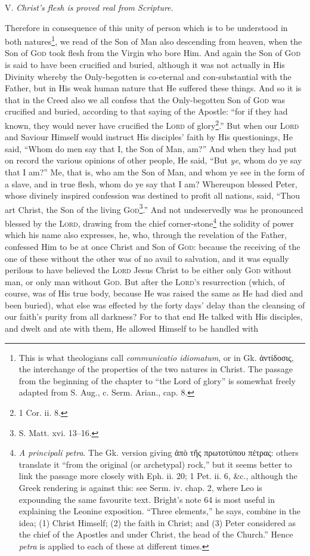 V. \emph{Christ’s flesh is proved real from Scripture.}

Therefore in consequence of this unity of person which is to be understood in both natures\footnote{This is what theologians call \emph{communicatio idiomatum}, or in Gk. \textgreek{ἀντίδοσις}, the interchange of the properties of the two natures in Christ. The passage from the beginning of the chapter to “the Lord of glory” is somewhat freely adapted from S. Aug., c. Serm. Arian., cap. 8.}, we read of the Son of Man also descending from heaven, when the Son of \textsc{God} took flesh from the Virgin who bore Him. And again the Son of \textsc{God} is said to have been crucified and buried, although it was not actually in His Divinity whereby the Only-begotten is co-eternal and con-substantial with the Father, but in His weak human nature that He suffered these things. And so it is that in the Creed also we all confess that the Only-begotten Son of \textsc{God} was crucified and buried, according to that saying of the Apostle: “for if they had known, they would never have crucified the \textsc{Lord} of glory\footnote{1 Cor. ii. 8.}.” But when our \textsc{Lord} and Saviour Himself would instruct His disciples’ faith by His questionings, He said, “Whom do men say that I, the Son of Man, am?” And when they had put on record the various opinions of other people, He said, “But \emph{ye}, whom do ye say that I am?” Me, that is, who am the Son of Man, and whom ye see in the form of a slave, and in true flesh, whom do ye say that I am? Whereupon blessed Peter, whose divinely inspired confession was destined to profit all nations, said, “Thou art Christ, the Son of the living \textsc{God\footnote{S. Matt. xvi. 13–16.}}.” And not undeservedly was he pronounced blessed by the \textsc{Lord}, drawing from the chief corner-stone\footnote{\emph{A principali petra}. The Gk. version giving \textgreek{ἀπὸ τῆς πρωτοτύπου πέτρας}: others translate it “from the original (or archetypal) rock,” but it seems better to link the passage more closely with Eph. ii. 20; 1 Pet. ii. 6, \&c., although the Greek rendering is against this: see Serm. iv. chap. 2, where Leo is expounding the same favourite text. Bright’s note 64 is most useful in explaining the Leonine exposition. “Three elements,” he says, combine in the idea; (1) Christ Himself; (2) the faith in Christ; and (3) Peter considered as the chief of the Apostles and under Christ, the head of the Church.” Hence \emph{petra} is applied to each of these at different times.} the solidity of power which his name also expresses, he, who, through the revelation of the Father, confessed Him to be at once Christ and Son of \textsc{God}: because the receiving of the one of these without the other was of no avail to salvation, and it was equally perilous to have believed the \textsc{Lord} Jesus Christ to be either only \textsc{God} without man, or only man without \textsc{God}. But after the \textsc{Lord’s} resurrection (which, of course, was of His true body, because He was raised the same as He had died and been buried), what else was effected by the forty days’ delay than the cleansing of our faith’s purity from all darkness? For to that end He talked with His disciples, and dwelt and ate with them, He allowed Himself to be handled with 